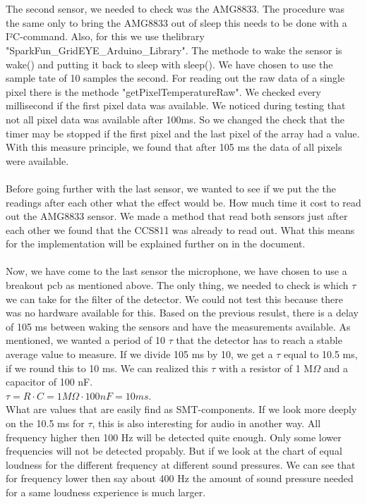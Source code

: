 \documentclass[11pt,a4paper]{article}
\begin{document}
\\ \\
 The second sensor, we needed to check was the AMG8833. The procedure was the same only to bring the AMG8833 out of sleep this needs to be done with a I²C-command. Also, for this we use thelibrary "SparkFun\_GridEYE\_Arduino\_Library". The methode to wake the sensor is wake() and putting it back to sleep with sleep(). We have chosen to use the sample tate of 10 samples the second. For reading out the raw data of a single pixel there is the methode "getPixelTemperatureRaw". We checked every millisecond if the first pixel data was available. We noticed during testing that not all pixel data was available after 100ms. So we changed the check that the timer may be stopped if the first pixel and the last pixel of the array had a value. With this measure principle, we found that after 105 ms the data of all pixels were available.
\\ \\  
Before going further with the last sensor, we wanted to see if we put the the readings after each other what the effect would be. How much time it cost to read out the AMG8833 sensor. We made a method that read both sensors just after each other we found that the CCS811 was already to read out. What this means for the implementation will be explained further on in the document. 
\\  \\ Now, we have come to the last sensor the microphone, we have chosen to use a breakout pcb as mentioned above. The only thing, we needed to check is which $\tau$ we can take for the filter of the detector. We could not test this because there was no hardware available for this. Based on the previous resulst, there is a delay of 105 ms between waking the sensors and have the measurements available. As mentioned, we wanted a period of 10 $\tau$ that the detector has to reach a stable average value to measure. If we divide 105 ms  by 10, we get  a $\tau$ equal to 10.5 ms, if we round this to 10 ms. We can realized this $\tau$ with a resistor  of 1 M$\Omega$ and a capacitor of 100 nF.\\
$\tau= R \cdot C = 1 M\Omega \cdot 100 nF= 10 ms$.\\
What are values that are easily find as SMT-components. If we look more deeply on the 10.5 ms for $\tau$, this is also interesting for audio in another way. All frequency higher then 100 Hz will be detected quite enough. Only some lower frequencies will not be detected propably. But if we look at the chart of equal loudness for the different frequency at different sound pressures. We can see that for frequency lower then say about 400 Hz the amount of sound pressure needed for a same loudness experience is much larger. 
\end{document}
